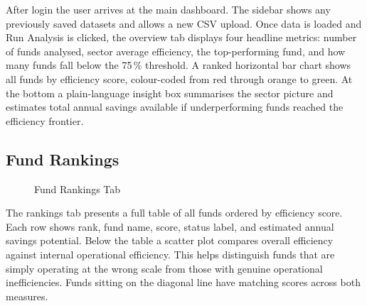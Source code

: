 \documentclass[12pt,a4paper]{report}
\begin{document}
After login the user arrives at the main dashboard. The sidebar shows any previously saved
datasets and allows a new CSV upload. Once data is loaded and Run Analysis is clicked, the
overview tab displays four headline metrics: number of funds analysed, sector average
efficiency, the top-performing fund, and how many funds fall below the 75\,\% threshold.
A ranked horizontal bar chart shows all funds by efficiency score, colour-coded from red
through orange to green. At the bottom a plain-language insight box summarises the sector
picture and estimates total annual savings available if underperforming funds reached
the efficiency frontier.

\subsection{Fund Rankings}

\begin{figure}[H]
\centering
{}
\caption{Fund Rankings Tab}
\label{fig:rankings}
\end{figure}

The rankings tab presents a full table of all funds ordered by efficiency score. Each row
shows rank, fund name, score, status label, and estimated annual savings potential. Below
the table a scatter plot compares overall efficiency against internal operational
efficiency. This helps distinguish funds that are simply operating at the wrong scale from
those with genuine operational inefficiencies. Funds sitting on the diagonal line have
matching scores across both measures.
\end{document}
